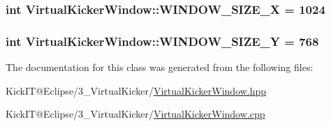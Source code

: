 \subsubsection[{\texorpdfstring{W\+I\+N\+D\+O\+W\+\_\+\+S\+I\+Z\+E\+\_\+X}{WINDOW_SIZE_X}}]{\setlength{\rightskip}{0pt plus 5cm}int Virtual\+Kicker\+Window\+::\+W\+I\+N\+D\+O\+W\+\_\+\+S\+I\+Z\+E\+\_\+X = 1024}\hypertarget{class_virtual_kicker_window_ac0dba6ae5e78a3c6bd80733352f3ff68}{}\label{class_virtual_kicker_window_ac0dba6ae5e78a3c6bd80733352f3ff68}
\subsubsection[{\texorpdfstring{W\+I\+N\+D\+O\+W\+\_\+\+S\+I\+Z\+E\+\_\+Y}{WINDOW_SIZE_Y}}]{\setlength{\rightskip}{0pt plus 5cm}int Virtual\+Kicker\+Window\+::\+W\+I\+N\+D\+O\+W\+\_\+\+S\+I\+Z\+E\+\_\+Y = 768}\hypertarget{class_virtual_kicker_window_aee668d4989faeb64811c2a30a386b8fb}{}\label{class_virtual_kicker_window_aee668d4989faeb64811c2a30a386b8fb}


The documentation for this class was generated from the following files\+:\begin{DoxyCompactItemize}
\item 
Kick\+I\+T@\+Eclipse/3\+\_\+\+Virtual\+Kicker/\hyperlink{_virtual_kicker_window_8hpp}{Virtual\+Kicker\+Window.\+hpp}\item 
Kick\+I\+T@\+Eclipse/3\+\_\+\+Virtual\+Kicker/\hyperlink{_virtual_kicker_window_8cpp}{Virtual\+Kicker\+Window.\+cpp}\end{DoxyCompactItemize}
